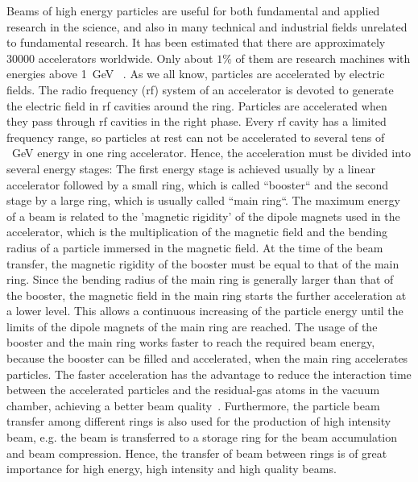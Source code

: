 %

Beams of high energy particles are useful for both fundamental and applied research in the science, and also in many technical and industrial fields unrelated to fundamental research. It has been estimated that there are approximately 30000 accelerators worldwide. Only about $1\%$ of them are research machines with energies above \SI{1}{GeV} ~\cite{noauthor_particle_2017}.  As we all know, particles are accelerated by electric fields. The radio frequency (rf) system of an accelerator is devoted to generate the electric field in rf cavities around the ring. Particles are accelerated when they pass through rf cavities in the right phase. Every rf cavity has a limited frequency range,  so particles at rest can not be accelerated to several tens of \SI{}{GeV} energy in one ring accelerator.  Hence, the acceleration must be divided into several energy stages: The first energy stage is achieved usually by a linear accelerator followed by a small ring, which is called ``booster`` and the second stage by a large ring, which is usually called ``main ring``.  The maximum energy of a beam is related to the 'magnetic rigidity' of the dipole magnets used in the accelerator, which is the multiplication of the magnetic field and the bending radius of a particle immersed in the magnetic field. At the time of the beam transfer, the magnetic rigidity of the booster must be equal to that of the main ring. Since the bending radius of the main ring is generally larger than that of the booster, the magnetic field in the main ring starts the further acceleration at a lower level. This allows a continuous increasing of the particle energy until the limits of the dipole magnets of the main ring are reached. The usage of the booster and the main ring works faster to reach the required beam energy, because the booster can be filled and accelerated, when the main ring accelerates particles. The faster acceleration has the advantage to reduce the interaction time between the accelerated particles and the residual-gas atoms in the vacuum chamber, achieving a better beam quality~\cite{moller_beam-residual_1999}. Furthermore, the particle beam transfer among different rings is also used for the production of high intensity beam, e.g. the beam is transferred to a storage ring for the beam accumulation and beam compression. Hence, the transfer of beam between rings is of great importance for high energy, high intensity and high quality beams.


